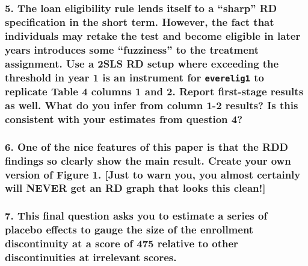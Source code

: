 \documentclass[
]{article}
\begin{document}
\subsubsection{\texorpdfstring{5. The loan eligibility rule lends itself
to a ``sharp'' RD specification in the short term. However, the fact
that individuals may retake the test and become eligible in later years
introduces some ``fuzziness'' to the treatment assignment. Use a 2SLS RD
setup where exceeding the threshold in year 1 is an instrument for
\texttt{everelig1} to replicate Table 4 columns 1 and 2. Report
first-stage results as well. What do you infer from column 1-2 results?
Is this consistent with your estimates from question
4?}{5. The loan eligibility rule lends itself to a ``sharp'' RD specification in the short term. However, the fact that individuals may retake the test and become eligible in later years introduces some ``fuzziness'' to the treatment assignment. Use a 2SLS RD setup where exceeding the threshold in year 1 is an instrument for everelig1 to replicate Table 4 columns 1 and 2. Report first-stage results as well. What do you infer from column 1-2 results? Is this consistent with your estimates from question 4?}}\label{the-loan-eligibility-rule-lends-itself-to-a-sharp-rd-specification-in-the-short-term.-however-the-fact-that-individuals-may-retake-the-test-and-become-eligible-in-later-years-introduces-some-fuzziness-to-the-treatment-assignment.-use-a-2sls-rd-setup-where-exceeding-the-threshold-in-year-1-is-an-instrument-for-everelig1-to-replicate-table-4-columns-1-and-2.-report-first-stage-results-as-well.-what-do-you-infer-from-column-1-2-results-is-this-consistent-with-your-estimates-from-question-4}

\subsubsection{6. One of the nice features of this paper is that the RDD
findings so clearly show the main result. Create your own version of
Figure 1. {[}Just to warn you, you almost certainly will NEVER get an RD
graph that looks this
clean!{]}}\label{one-of-the-nice-features-of-this-paper-is-that-the-rdd-findings-so-clearly-show-the-main-result.-create-your-own-version-of-figure-1.-just-to-warn-you-you-almost-certainly-will-never-get-an-rd-graph-that-looks-this-clean}

\subsubsection{7. This final question asks you to estimate a series of
placebo effects to gauge the size of the enrollment discontinuity at a
score of 475 relative to other discontinuities at irrelevant
scores.}\label{this-final-question-asks-you-to-estimate-a-series-of-placebo-effects-to-gauge-the-size-of-the-enrollment-discontinuity-at-a-score-of-475-relative-to-other-discontinuities-at-irrelevant-scores.}
\end{document}
